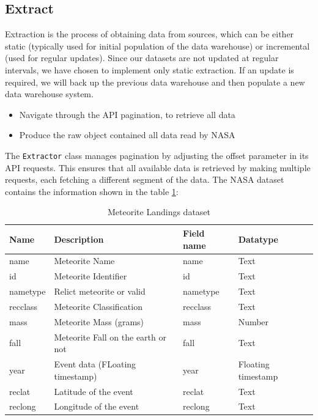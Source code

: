 \documentclass[conference]{IEEEtran}
\begin{document}
	\subsection{Extract}
   Extraction is the process of obtaining data from sources, which can be either static (typically used for initial population of the data warehouse) or incremental (used for regular updates). Since our datasets are not updated at regular intervals, we have chosen to implement only static extraction. If an update is required, we will back up the previous data warehouse and then populate a new data warehouse system.
    \begin{itemize}
    	\item Navigate through the API pagination, to retrieve all data
    	\item Produce the raw object contained all data read by NASA
    \end{itemize}
    The \texttt{Extractor} class manages pagination by adjusting the offset parameter in its API requests. This ensures that all available data is retrieved by making multiple requests, each fetching a different segment of the data.
    The NASA dataset contains the information shown in the table \ref{tab:nasa_dataset}:
    \begin{table}[httb]
    	\centering
    	\caption{Meteorite Landings dataset}
    	\begin{tabular}{|p{1cm}|p{4cm}|p{1cm}|p{1cm}|}
    		\hline
    		\textbf{Name} & \textbf{Description} & \textbf{Field name} & \textbf{Datatype} \\ \hline
    		name & Meteorite Name & name & Text \\ \hline
    		id   & Meteorite Identifier  & id & Text \\ \hline
    		nametype & Relict meteorite or valid & nametype & Text \\ \hline
    		recclass & Meteorite Classification & recclass & Text \\ \hline
    		mass & Meteorite Mass (grams) & mass & Number \\ \hline
    		fall & Meteorite Fall on the earth or not & fall & Text \\ \hline
    		year & Event data (FLoating timestamp) & year & Floating timestamp \\ \hline
    		reclat & Latitude of the event & reclat & Text \\ \hline
    		reclong & Longitude of the event & reclong & Text \\ \hline
    	\end{tabular}
    	\label{tab:nasa_dataset}
    \end{table}
\end{document}
